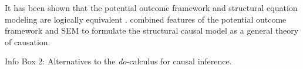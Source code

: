 \documentclass[nobib]{tufte-handout}
\newcommand{\docalc}{\emph{do}-calculus\xspace}
\begin{document}
\begin{InfoBox}
{\begin{minipage}{1\textwidth}
    It has been shown that the potential outcome framework and structural equation modeling are logically equivalent \citep{galles1998axiomatic, halpern2000axiomatizing}.
    \citet{pearl2000models} combined features of the potential outcome framework and SEM to formulate the structural causal model as a general theory of causation.

    \medskip


  \end{minipage}
}
\begin{center}
Info Box 2: Alternatives to the \docalc for causal inference.
\end{center}
\end{InfoBox}



\printbibliography[heading=bibintoc]
\end{document}
